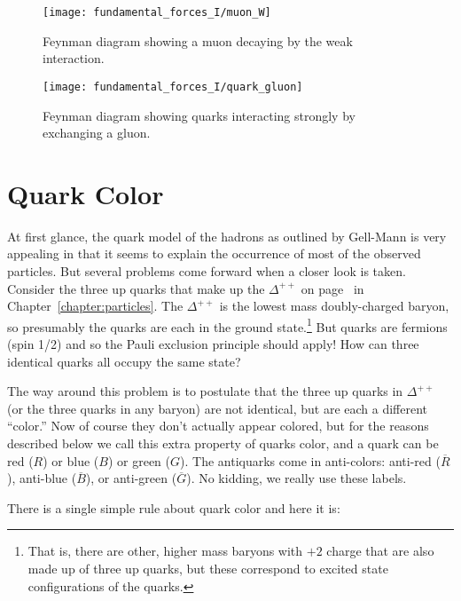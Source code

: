\begin{figure}[tbp]
\begin{minipage}[t]{6.0cm}
\begin{center}
\texttt{[image: fundamental\_forces\_I/muon\_W]}
\caption{Feynman diagram showing a muon decaying by the weak
interaction.} \label{fig:muon_W}
\end{center}
\end{minipage}
\hfill
\begin{minipage}[t]{6.0cm}
\begin{center}
\texttt{[image: fundamental\_forces\_I/quark\_gluon]}
\caption{Feynman diagram showing quarks interacting strongly by
exchanging a gluon.} \label{fig:quark_gluon}
\end{center}
\end{minipage}
\end{figure}

\section{Quark Color}

At first glance, the quark model of the hadrons as outlined by
Gell-Mann is very appealing in that it seems to explain the occurrence
of most of the observed particles.  But several problems come forward
when a closer look is taken.  Consider the three up quarks that make
up the $\Delta^{++}$ on page~\pageref{ex:delta} in 
Chapter~\ref{chapter:particles}.  The $\Delta^{++}$ is the lowest
mass doubly-charged baryon, so presumably the quarks are each in the
ground state.\footnote{That is, there are other, higher mass baryons
with $+2$ charge that are also made up of three up quarks, but these
correspond to excited state configurations of the quarks.}  But quarks
are fermions (spin 1/2) and so the Pauli exclusion principle should
apply!  How can three identical quarks all occupy the same state?

The way around this problem is to postulate that the three up quarks
in $\Delta^{++}$ (or the three quarks in any baryon) are not
identical, but are each a different ``color.''  Now of course they
don't actually appear colored, but for the reasons described below we
call this extra property of quarks color, and a quark can be red ($R$)
or blue ($B$) or green ($G$).  The antiquarks come in anti-colors:
anti-red ($\overline R$), anti-blue ($\overline B$), or anti-green
($\overline G$).  No kidding, we really use these labels.

There is a single simple rule about quark color and here it is:

